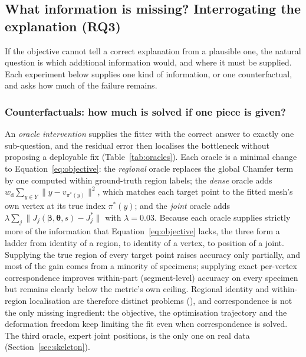 \subsection{What information is missing? Interrogating the explanation (RQ3)}
\label{sec:diagnosis}

If the objective cannot tell a correct explanation from a plausible one, the
natural question is which additional information would, and where it must be
supplied. Each experiment below supplies one kind of information, or one
counterfactual, and asks how much of the failure remains.

\subsubsection{Counterfactuals: how much is solved if one piece is given?}
\label{sec:oracle}

An \emph{oracle intervention} supplies the fitter with the correct answer to
exactly one sub-question, and the residual error then localises the bottleneck
without proposing a deployable fix (Table~\ref{tab:oracles}). Each oracle is a
minimal change to Equation~\eqref{eq:objective}: the \emph{regional} oracle
replaces the global Chamfer term by one computed within ground-truth region
labels; the \emph{dense} oracle adds
$w_{\mathrm{d}}\sum_{y\in Y}\|y-v_{\pi^\ast(y)}\|^2$, which matches each target
point to the fitted mesh's own vertex at its true index $\pi^\ast(y)$; and the
\emph{joint} oracle adds $\lambda\sum_j\|J_j(\bm\beta,\bm\theta,s)-J^\ast_j\|$
with $\lambda=0.03$. Because each oracle supplies strictly more of the
information that Equation~\eqref{eq:objective} lacks, the three form a ladder
from identity of a region, to identity of a vertex, to position of a joint. Supplying the
true region of every target point raises accuracy only partially, and most of
the gain comes from a minority of specimens; supplying exact per-vertex
correspondence improves within-part (segment-level) accuracy on every specimen
but remains clearly below the metric's own ceiling. Regional identity and
within-region localisation are therefore distinct problems (), and
correspondence is not the only missing ingredient: the objective, the
optimisation trajectory and the deformation freedom keep limiting the fit even
when correspondence is solved. The third oracle, expert joint positions, is the
only one on real data (Section~\ref{sec:skeleton}).


